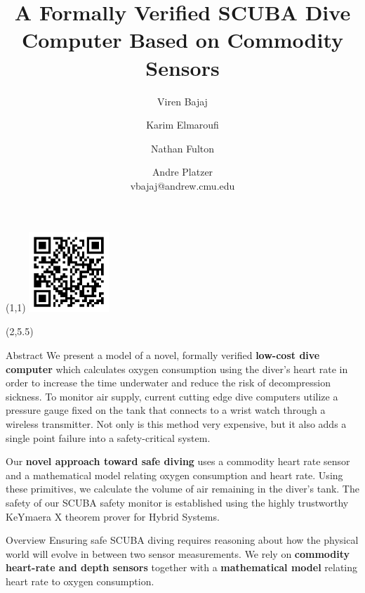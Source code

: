 \documentclass[final]{beamer}
\title{A Formally Verified SCUBA Dive Computer Based on Commodity Sensors}
\author{Viren Bajaj  \and Karim Elmaroufi \and Nathan Fulton \and Andre Platzer\\
    vbajaj@andrew.cmu.edu}
\date{}
\theoremstyle{definition}
\begin{document}
\begin{frame}[fragile]


\begin{textblock}{10}(1,1)
\includegraphics[height=3cm]{images/scuba_qr.png}
\end{textblock}


\begin{textblock}{27}(2,5.5)

\begin{block}{Abstract}
We present a model of a novel, formally verified \textbf{low-cost dive computer} which calculates oxygen consumption using the diver's heart rate in order to increase the time underwater and reduce the risk of decompression sickness. To monitor air supply, current cutting edge dive computers utilize a pressure gauge fixed on the tank that connects to a wrist watch through a wireless transmitter. Not only is this method very expensive, but it also adds a single point failure into a safety-critical system. 

Our \textbf{novel approach toward safe diving} uses a commodity heart rate sensor and a mathematical model relating oxygen consumption and heart rate. Using these primitives, we calculate the volume of air remaining in the diver's tank. The safety of our SCUBA safety monitor is established using the highly trustworthy KeYmaera X theorem prover for Hybrid Systems.
\end{block}
\begin{block}{Overview}
Ensuring safe SCUBA diving requires reasoning about how the physical world will evolve in between two sensor measurements. We rely on \textbf{commodity heart-rate and depth sensors} together with a \textbf{mathematical model} relating heart rate to oxygen consumption.
\hfill \break


\end{block}
\end{textblock}
\end{frame}
\end{document}
